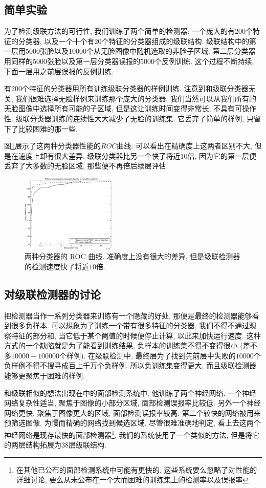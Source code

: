 \documentclass[a4paper,utf8,11pt, onecolumn]{ctexart}
\begin{document}
\subsection{简单实验}
为了检测级联方法的可行性, 我们训练了两个简单的检测器: 一个庞大的有$200$个特征的分类器, 以及一个十个有$20$个特征的分类器组成的级联结构. 级联结构中的第一层用$5000$张脸以及$10000$个从无脸图像中随机选取的非脸子区域.
第二层分类器用同样的$5000$张脸以及第一层分类器误报的$5000$个反例训练. 这个过程不断持续, 下面一层用之前层误报的反例训练.

有$200$个特征的分类器用所有训练级联分类器的样例训练. 注意到和级联分类器无关, 我们很难选择无脸样例来训练那个庞大的分类器. 我们当然可以从我们所有的无脸图像中选择所有可能的子区域, 但是这让训练时间变得非常长, 不具有可操作性. 级联分类器训练的连续性大大减少了无脸的训练集. 它丢弃了简单的样例, 只留下了比较困难的那一些.

图\ref{fig:comp}展示了这两种分类器性能的$ROC$曲线. 可以看出在精确度上这两者区别不大, 但是在速度上却有很大差异. 级联分类器比另一个快了将近$10$倍, 因为它的第一层便丢弃了大多数的无脸区域, 那些便不再倍后续层评估.
\begin{figure}
\centering
\includegraphics[width=0.4\textwidth]{ROC.png}
\caption{两种分类器的 ROC 曲线. 准确度上没有很大的差异, 但是级联检测器的检测速度快了将近$10$倍.}
\label{fig:comp}
\end{figure}
\subsection{对级联检测器的讨论}
把检测器当作一系列分类器来训练有一个隐藏的好处, 那便是最终的检测器能够看到很多负样本. 可以想象为了训练一个带有很多特征的分类器, 我们不得不通过观察特征的部分和, 当它低于某个阈值的时候便停止计算, 以此来加快运行速度. 这种方式的一个缺陷就是为了能看到训练结果, 负样本的训练集不得不变得很小 (差不多$10000-100000$个样例).
在级联检测中, 最终层为了找到先前层中失败的$10000$个负样例不得不搜寻成百上千万个负样例. 所以负训练集变得更大, 而且级联检测器能够更聚焦于困难的样例.

和级联相似的想法出现在\citet{rowley1998neural}中的面部检测系统中. 他训练了两个神经网络. 一个神经网络复杂性适当, 聚焦于图像的小部分区域, 面部检测误报率比较低. 另外一个神经网络更快, 聚焦于图像更大的区域, 面部检测误报率较高. 第二个较快的网络被用来预筛选图像, 为慢而精确的网络找到候选区域.
尽管很难准确地判定, 看上去这两个神经网络是现存最快的面部检测器\footnote{在其他已公布的面部检测系统中可能有更快的. 这些系统要么忽略了对性能的详细讨论, 要么从未公布在一个大而困难的训练集上的检测率以及误报率}. 我们的系统使用了一个类似的方法, 但是将它的两层结构拓展为$38$层级联结构.
\end{document}
